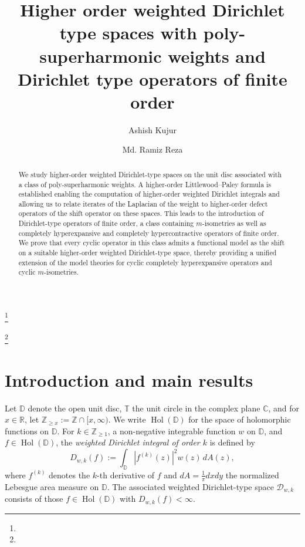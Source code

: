 \documentclass[10pt,oneside,reqno]{amsart}
\theoremstyle{definition}
\theoremstyle{remark}
\newcommand{\R}{\mathbb R}
\newcommand{\C}{\mathbb C}
\newcommand{\D}{\mathbb D}
\newcommand{\T}{\mathbb T}
\numberwithin{equation}{section}
\begin{document}
\title[Weighted Dirichlet type spaces with poly-superharmonic weights]{Higher order weighted Dirichlet type spaces with poly-superharmonic weights and Dirichlet type operators of finite order}

\author{Ashish Kujur}
\address{School of Mathematics \\
Indian Institute of Science Education and Research \\
Thiruvananthapuram.}
\thanks{}

\author{Md. Ramiz Reza}
\address{School of Mathematics \\
Indian Institute of Science Education and Research \\
Thiruvananthapuram.}
\thanks{}


\begin{abstract}
We study higher-order weighted Dirichlet-type spaces on the unit disc associated with a class of poly-superharmonic weights. A higher-order Littlewood–Paley formula is established enabling the computation of higher-order weighted Dirichlet integrals and allowing us to relate iterates of the Laplacian of the weight to higher-order defect operators of the shift operator on these spaces. This leads to the introduction of Dirichlet-type operators of finite order, a class containing $m$-isometries as well as completely hyperexpansive and completely hypercontractive operators of finite order. We prove that every cyclic operator in this class admits a functional model as the shift on a suitable higher-order weighted Dirichlet-type space, thereby providing a unified extension of the model theories for cyclic completely hyperexpansive operators and cyclic $m$-isometries.
\end{abstract}

\maketitle

\section{Introduction and main results}

Let $\D$ denote the open unit disc, $\T$ the unit circle in the complex plane $\C$, and for $x\in \R$, let $\mathbb Z_{\geqslant x} := \mathbb Z \cap [x,\infty).$ We write $\operatorname{Hol}(\D)$ for the space of holomorphic functions on $\D$. For $k \in \mathbb Z_{\geqslant 1}$, a non-negative integrable function $w$ on $\D$, and $f\in \operatorname{Hol}(\D)$, the \emph{weighted Dirichlet integral of order $k$} is defined by  
\[
D_{w,k}(f) := \int_{\D} |f^{(k)}(z)|^2 w(z)\, dA(z),
\]
where $f^{(k)}$ denotes the $k$-th derivative of $f$ and $dA=\frac{1}{\pi} dx dy$ the normalized Lebesgue area measure on $\D$. The associated weighted Dirichlet-type space $\mathscr D_{w,k}$ consists of those $f\in \operatorname{Hol}(\D)$ with $D_{w,k}(f)<\infty$.  
\end{document}
